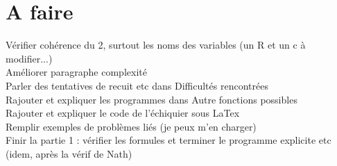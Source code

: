 \documentclass[a4paper]{article}
\begin{document}
\section{A faire}
Vérifier cohérence du 2, surtout les noms des variables (un R et un c à modifier...)\\
Améliorer paragraphe complexité\\
Parler des tentatives de recuit etc dans Difficultés rencontrées\\
Rajouter et expliquer les programmes dans Autre fonctions possibles\\
Rajouter et expliquer le code de l'échiquier sous LaTex\\
Remplir exemples de problèmes liés (je peux m'en charger)\\
Finir la partie 1 : vérifier les formules et terminer le programme explicite etc (idem, après la vérif de Nath)\\
\end{document}
